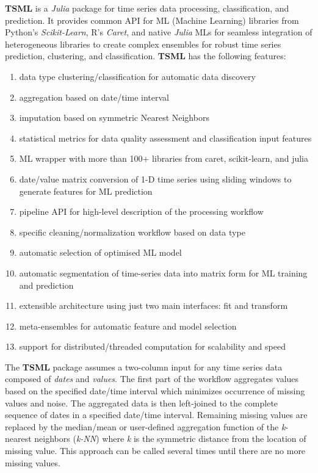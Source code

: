 \documentclass{juliacon}
\begin{document}
\textbf{TSML}\cite{tsml2019} is a \emph{Julia}\cite{bezanson2017julia} package for time series data processing, classification, and prediction. 
It provides common API for ML (Machine Learning) libraries from Python's \emph{Scikit-Learn}, 
R's \emph{Caret}, and native \emph{Julia} MLs for seamless integration of heterogeneous 
libraries to create complex ensembles for robust time series prediction, clustering, and classification.
\textbf{TSML} has the following features:
\begin{enumerate}
\item data type clustering/classification for automatic data discovery
\item aggregation based on date/time interval
\item imputation based on symmetric Nearest Neighbors
\item statistical metrics for data quality assessment and classification input features
\item ML wrapper with more than 100+ libraries from caret, scikit-learn, and julia
\item date/value matrix conversion of 1-D time series using sliding windows to generate features for ML prediction
\item pipeline API for high-level description of the processing workflow
\item specific cleaning/normalization workflow based on data type
\item automatic selection of optimised ML model
\item automatic segmentation of time-series data into matrix form for ML training and prediction 
\item extensible architecture using just two main interfaces: fit and transform
\item meta-ensembles for automatic feature and model selection
\item support for distributed/threaded computation for scalability and speed
\end{enumerate}

The \textbf{TSML} package assumes a two-column input for any time series data composed of \emph{dates} and \emph{values}. The first part of the workflow aggregates values based on the specified date/time interval which minimizes occurrence of missing values and noise. The aggregated data is then left-joined to the complete sequence of dates in a specified date/time interval. Remaining missing values are replaced by the median/mean or user-defined aggregation function of the \textit{k}-nearest neighbors (\emph{k-NN}) where \textit{k} is the symmetric distance from the location of missing value. This approach can be called several times until there are no more missing values.
\end{document}

